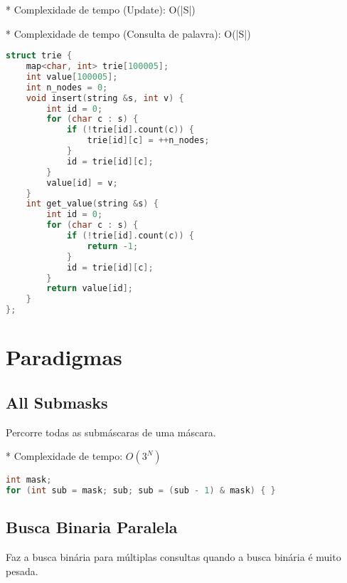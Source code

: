 \documentclass[11pt, a4paper, oneside]{book}
\begin{document}
* Complexidade de tempo (Update): O(|S|)

* Complexidade de tempo (Consulta de palavra): O(|S|)

\hfill

\begin{multicols}{2}
\begin{lstlisting}[language=C++]
struct trie {
    map<char, int> trie[100005];
    int value[100005];
    int n_nodes = 0;
    void insert(string &s, int v) {
        int id = 0;
        for (char c : s) {
            if (!trie[id].count(c)) {
                trie[id][c] = ++n_nodes;
            }
            id = trie[id][c];
        }
        value[id] = v;
    }
    int get_value(string &s) {
        int id = 0;
        for (char c : s) {
            if (!trie[id].count(c)) {
                return -1;
            }
            id = trie[id][c];
        }
        return value[id];
    }
};
\end{lstlisting}
\end{multicols}

\hfill

\newpage

%
%
%
%

\chapter{Paradigmas}

\section{All Submasks}


Percorre todas as submáscaras de uma máscara.



* Complexidade de tempo: $O(3^N)$

\hfill

\begin{multicols}{2}
\begin{lstlisting}[language=C++]
int mask;
for (int sub = mask; sub; sub = (sub - 1) & mask) { }
\end{lstlisting}
\end{multicols}

\hfill

\section{Busca Binaria Paralela}


Faz a busca binária para múltiplas consultas quando a busca binária é muito pesada.
\end{document}
